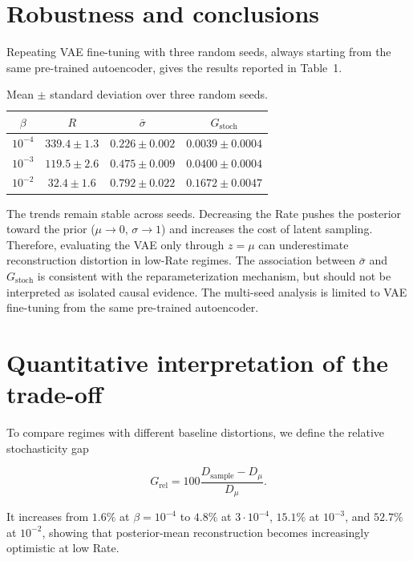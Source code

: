 \documentclass{article}
\begin{document}
\section*{Robustness and conclusions}

Repeating VAE fine-tuning with three random seeds, always starting from the same pre-trained autoencoder, gives the results reported in Table~1.

\begin{table}[t]
\centering
\caption{Mean $\pm$ standard deviation over three random seeds.}
\label{tab:seed}
\begin{tabular}{cccc}
\toprule
$\beta$ & $R$ & $\bar{\sigma}$ & $G_{\mathrm{stoch}}$ \\
\midrule
$10^{-4}$ & $339.4\pm1.3$ & $0.226\pm0.002$ & $0.0039\pm0.0004$ \\
$10^{-3}$ & $119.5\pm2.6$ & $0.475\pm0.009$ & $0.0400\pm0.0004$ \\
$10^{-2}$ & $32.4\pm1.6$ & $0.792\pm0.022$ & $0.1672\pm0.0047$ \\
\bottomrule
\end{tabular}
\end{table}

The trends remain stable across seeds. Decreasing the Rate pushes the posterior toward the prior ($\mu\rightarrow0$, $\sigma\rightarrow1$) and increases the cost of latent sampling. Therefore, evaluating the VAE only through $z=\mu$ can underestimate reconstruction distortion in low-Rate regimes. The association between $\bar{\sigma}$ and $G_{\mathrm{stoch}}$ is consistent with the reparameterization mechanism, but should not be interpreted as isolated causal evidence. The multi-seed analysis is limited to VAE fine-tuning from the same pre-trained autoencoder.

\section*{Quantitative interpretation of the trade-off}

To compare regimes with different baseline distortions, we define the relative stochasticity gap

\begin{equation}
G_{\mathrm{rel}}
=
100\frac{D_{\mathrm{sample}}-D_\mu}{D_\mu}.
\end{equation}

It increases from $1.6\%$ at $\beta=10^{-4}$ to $4.8\%$ at $3\cdot10^{-4}$, $15.1\%$ at $10^{-3}$, and $52.7\%$ at $10^{-2}$, showing that posterior-mean reconstruction becomes increasingly optimistic at low Rate.
\end{document}
